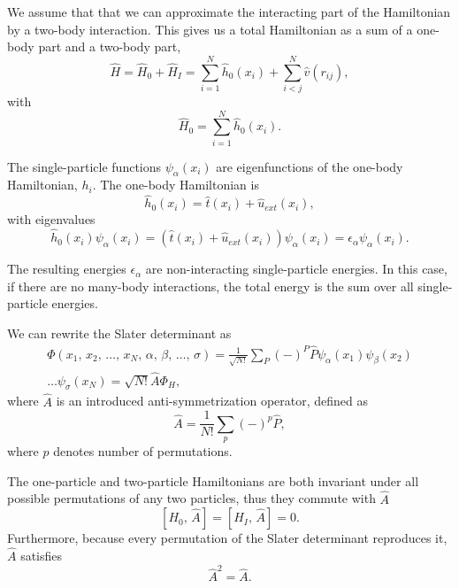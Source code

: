 	We assume that that we can approximate the interacting part of the Hamiltonian by a two-body interaction. This gives us a total Hamiltonian as a sum of a one-body part and a two-body part,
	\[
	\hat{H}=\hat{H}_{0}+\hat{H}_{I}=\sum_{i=1}^{N}\hat{h}_{0}\left(x_{i}\right)+\sum_{i<j}^{N}\hat{v}\left(r_{ij}\right),
	\]
	with 
	\[
	\hat{H}_{0}=\sum_{i=1}^{N}\hat{h}_{0}\left(x_{i}\right).
	\]

	The single-particle functions $\psi_{\alpha}(x_i)$ are eigenfunctions of the one-body Hamiltonian, $h_i$. The one-body Hamiltonian is 
	\[
	\hat{h}_{0}\left(x_{i}\right)=\hat{t}\left(x_{i}\right)+\hat{u}_{ext}\left(x_{i}\right),
	\]
	with eigenvalues
	\[
	\hat{h}_{0}\left(x_{i}\right)\psi_{\alpha}\left(x_{i}\right)=\left(\hat{t}\left(x_{i}\right)+\hat{u}_{ext}\left(x_{i}\right)\right)\psi_{\alpha}\left(x_{i}\right)=\epsilon_{\alpha}\psi_{\alpha}\left(x_{i}\right).
	\]

	The resulting energies $\epsilon_{\alpha}$ are non-interacting single-particle energies. In this case, if there are no many-body interactions, the total energy is the sum over all single-particle energies. 

	We can rewrite the Slater determinant as 
	\begin{eqnarray*}
		\Phi\left(x_{1},\, x_{2},\,\dots,\, x_{N},\,\alpha,\,\beta,\,\dots,\,\sigma\right)=\frac{1}{\sqrt{N!}}\sum_{P}\left(-\right)^{P}\hat{P}\psi_{\alpha}\left(x_{1}\right)\psi_{\beta}\left(x_{2}\right)\\
		\dots\psi_{\sigma}\left(x_{N}\right)=\sqrt{N!}\hat{A}\Phi_{H},
	\end{eqnarray*}
	where $\hat{A}$ is an introduced anti-symmetrization operator, defined as
	\[
	\hat{A}=\frac{1}{N!}\sum_{p}\left(-\right)^{p}\hat{P},
	\]
	where $p$ denotes number of permutations.

	The one-particle and two-particle Hamiltonians are both invariant under all possible permutations of any two particles, thus they commute with $\hat{A}$
	\begin{equation} \label{eq:HFcomAntiSym}
		\left[H_{0},\,\hat{A}\right]=\left[H_{I},\,\hat{A}\right]=0.
	\end{equation}
	Furthermore, because every permutation of the Slater determinant reproduces it, $\hat{A}$ satisfies
	\begin{equation} \label{eq:HFAntiSymSq}
		\hat{A}^{2}=\hat{A}.
	\end{equation}

